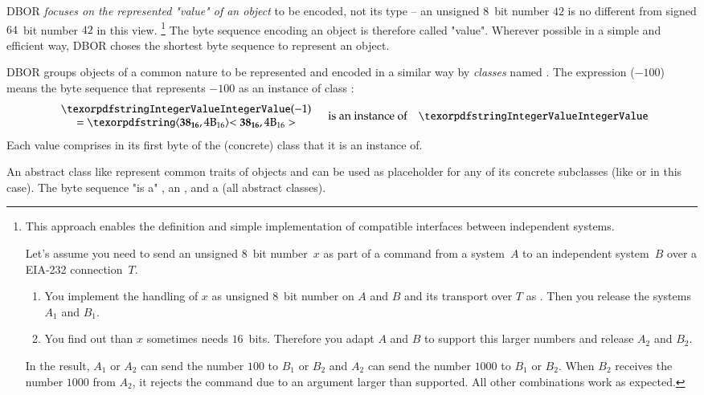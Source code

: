 \medskip
DBOR \emph{focuses on the represented "value" of an object} to be encoded, not its type --
an unsigned $8$~bit number $42$ is no different from signed $64$~bit number $42$ in this view.%
\footnote{%
    This approach enables the definition and simple implementation of compatible interfaces between independent systems.

    Let's assume you need to send an unsigned $8$~bit number~$x$ as part of a command from a system~$A$ to
    an independent system~$B$ over a EIA-232 connection~$T$.
    \begin{enumerate}
        \item
        You implement the handling of $x$ as unsigned $8$~bit number on $A$ and $B$ and its transport over $T$
        as \DborIntegerValue{}.
        Then you release the systems~$A_1$ and $B_1$.

        \item
        You find out than $x$ sometimes needs $16$~bits.
        Therefore you adapt $A$ and $B$ to support this larger numbers and release $A_2$ and $B_2$.
    \end{enumerate}

    In the result, $A_1$ or $A_2$ can send the number $100$ to $B_1$ or $B_2$ and
    $A_2$ can send the number $1000$ to $B_1$ or $B_2$.
    When $B_2$ receives the number $1000$ from $A_2$, it rejects the command due to an argument larger than supported.
    All other combinations work as expected.
}
The byte sequence encoding an object is therefore called "value".
Wherever possible in a simple and efficient way, DBOR choses the shortest byte sequence to represent an object.

\medskip
DBOR groups objects of a common nature to be represented and encoded in a similar way by \emph{classes}
named .
The expression \DborIntegerValue($-100$) means the byte sequence that represents $-100$ as an instance of
class \DborIntegerValue{}:
\begin{equation*}
    \begin{array}{c}
        \DborIntegerValue(-1) \\
        = \ByteSequence{\DborFirstByteNumber{38}, \DborNextByte{4B}}
    \end{array}
    \quad\text{is an instance of}\quad \DborIntegerValue
\end{equation*}
Each value comprises in its first byte of the (concrete) class that it is an instance of.

\medskip
An abstract class like \DborNumberValue{} represent common traits of objects and can be used as placeholder for any
of its concrete subclasses (like \DborIntegerValue{} or \DborInfinityValue{} in this case).
The byte sequence  "is a" \DborNumberValue{},
an \DborElementaryValue{}, and a \DborValue{} (all abstract classes).

